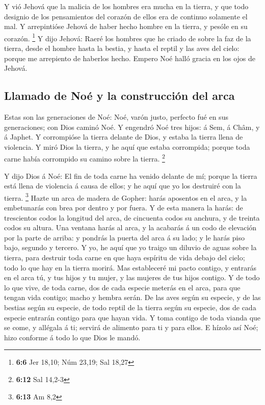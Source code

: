 Y vió Jehová que la malicia de los hombres era mucha en
la tierra, y que todo designio de los pensamientos del corazón de ellos
era de continuo solamente el mal.  Y arrepintióse Jehová
de haber hecho hombre en la tierra, y pesóle en su corazón. \footnote{\textbf{6:6}
  Jer 18,10; Núm 23,19; Sal 18,27}  Y dijo Jehová: Raeré
los hombres que he criado de sobre la faz de la tierra, desde el hombre
hasta la bestia, y hasta el reptil y las aves del cielo: porque me
arrepiento de haberlos hecho.  Empero Noé halló gracia en
los ojos de Jehová.

\hypertarget{llamado-de-nouxe9-y-la-construcciuxf3n-del-arca}{%
\subsection{Llamado de Noé y la construcción del
arca}\label{llamado-de-nouxe9-y-la-construcciuxf3n-del-arca}}

 Estas son las generaciones de Noé: Noé, varón justo,
perfecto fué en sus generaciones; con Dios caminó Noé.  Y
engendró Noé tres hijos: á Sem, á Châm, y á Japhet.  Y
corrompióse la tierra delante de Dios, y estaba la tierra llena de
violencia.  Y miró Dios la tierra, y he aquí que estaba
corrompida; porque toda carne había corrompido su camino sobre la
tierra. \footnote{\textbf{6:12} Sal 14,2-3}

 Y dijo Dios á Noé: El fin de toda carne ha venido
delante de mí; porque la tierra está llena de violencia á causa de
ellos; y he aquí que yo los destruiré con la tierra. \footnote{\textbf{6:13}
  Am 8,2}  Hazte un arca de madera de Gopher: harás
aposentos en el arca, y la embetunarás con brea por dentro y por fuera.
 Y de esta manera la harás: de trescientos codos la
longitud del arca, de cincuenta codos su anchura, y de treinta codos su
altura.  Una ventana harás al arca, y la acabarás á un
codo de elevación por la parte de arriba: y pondrás la puerta del arca á
su lado; y le harás piso bajo, segundo y tercero.  Y yo,
he aquí que yo traigo un diluvio de aguas sobre la tierra, para destruir
toda carne en que haya espíritu de vida debajo del cielo; todo lo que
hay en la tierra morirá.  Mas estableceré mi pacto
contigo, y entrarás en el arca tú, y tus hijos y tu mujer, y las mujeres
de tus hijos contigo.  Y de todo lo que vive, de toda
carne, dos de cada especie meterás en el arca, para que tengan vida
contigo; macho y hembra serán.  De las aves según su
especie, y de las bestias según su especie, de todo reptil de la tierra
según su especie, dos de cada especie entrarán contigo para que hayan
vida.  Y toma contigo de toda vianda que se come, y
allégala á ti; servirá de alimento para ti y para ellos. 
E hízolo así Noé; hizo conforme á todo lo que Dios le mandó.

